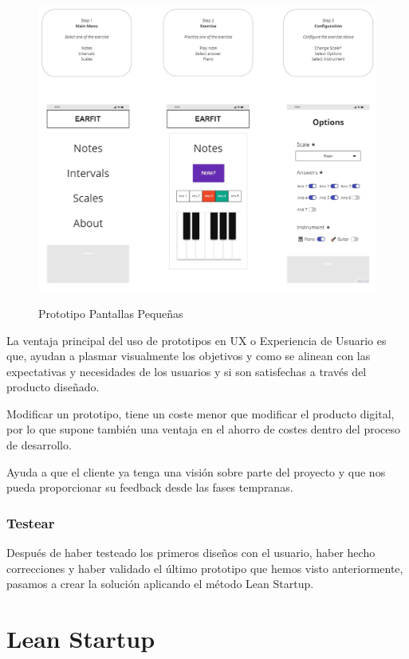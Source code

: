 \documentclass[12pt,twoside,titlepage]{report}
\begin{document}
\begin{figure}[H]
        \centering
        \includegraphics[scale=0.33]{Design Thinking/Prototipo/Small/Prototipo}
        \label{fig:PrototipoSmall}
        \caption{Prototipo Pantallas Pequeñas}
    \end{figure}

La ventaja principal del uso de prototipos en UX o Experiencia de Usuario es que, ayudan a plasmar visualmente los objetivos y como se alinean con las expectativas y necesidades de los usuarios y si son satisfechas a través del producto diseñado.

Modificar un prototipo, tiene un coste menor que modificar el producto digital, por lo que supone también una ventaja en el ahorro de costes dentro del proceso de desarrollo.

Ayuda a que el cliente ya tenga una visión sobre parte del proyecto y que nos pueda proporcionar su feedback desde las fases tempranas.

\subsubsection{Testear}

Después de haber testeado los primeros diseños con el usuario, haber hecho correcciones y haber validado el último prototipo que hemos visto anteriormente, pasamos a crear la solución aplicando el método Lean Startup.

\section{Lean Startup}
\end{document}
